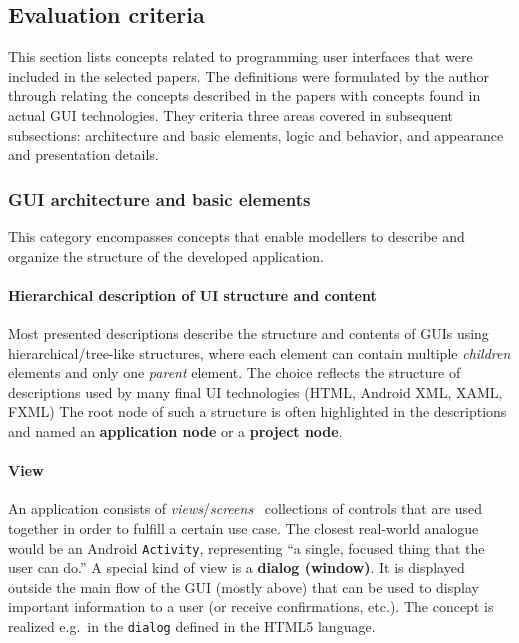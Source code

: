 \subsection{Evaluation criteria}\label{subsec:evaluation-criteria}

This section lists concepts related to programming user interfaces that were included in the selected papers.
The definitions were formulated by the author through relating the concepts described in the papers with concepts found in actual GUI technologies.
They criteria three areas covered in subsequent subsections: architecture and basic elements, logic and behavior, and appearance and presentation details.

\subsubsection{GUI architecture and basic elements}
This category encompasses concepts that enable modellers to describe and organize the structure of the developed application.

\paragraph{Hierarchical description of UI structure and content}
Most presented descriptions describe the structure and contents of GUIs using hierarchical/tree-like structures, where each element can contain multiple \emph{children} elements and only one \emph{parent} element.
The choice reflects the structure of descriptions used by many final UI technologies (HTML, Android XML, XAML, FXML)
The root node of such a structure is often highlighted in the descriptions and named an \textbf{application node} or a \textbf{project node}.

\paragraph{View}
An application consists of \emph{views}/\emph{screens} \textendash\ collections of controls that are used together in order to fulfill a certain use case.
The closest real-world analogue would be an Android \texttt{Activity}, representing \enquote{a single, focused thing that the user can do.}
A special kind of view is a \textbf{dialog (window)}.
It is displayed outside the main flow of the GUI (mostly above) that can be used to display important information to a user (or receive confirmations, etc.).
The concept is realized e.g.\ in the \texttt{dialog} defined in the HTML5 language.

